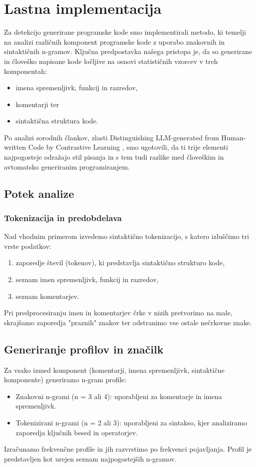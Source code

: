 \documentclass[sigconf,nonacm]{acmart}
\begin{document}
\section{Lastna implementacija}
Za detekcijo generirane programske kode smo implementirali metodo, ki temelji na analizi različnih komponent programske kode z uporabo znakovnih in sintaktičnih n-gramov. Ključna predpostavka našega pristopa je, da so generirane in človeško napisane kode ločljive na osnovi statističnih vzorcev v treh komponentah:
\begin{itemize}
	\item imena spremenljivk, funkcij in razredov,
	\item komentarji ter
	\item sintaktična struktura kode.
\end{itemize}
Po analizi sorodnih člankov, zlasti Distinguishing LLM-generated from Human-written Code by Contrastive Learning \cite{xu2024distinguishing}, smo ugotovili, da ti trije elementi najpogosteje odražajo stil pisanja in s tem tudi razlike med človeškim in avtomatsko generiranim programiranjem.
\subsection{Potek analize}
\subsubsection{Tokenizacija in predobdelava}
Nad vhodnim primerom izvedemo sintaktično tokenizacijo, s katero izluščimo tri vrste podatkov:
\begin{enumerate}
	\item zaporedje števil (tokenov), ki predstavlja sintaktično strukturo kode,
	\item seznam imen spremenljivk, funkcij in razredov,
	\item seznam komentarjev.
\end{enumerate}
Pri predprocesiranju imen in komentarjev črke v nizih pretvorimo na male, skrajšamo zaporedja "praznih" znakov ter odstranimo vse ostale nečrkovne znake.

\subsection{Generiranje profilov in značilk}
Za vsako izmed komponent (komentarji, imena spremenljivk, sintaktične komponente) generiramo n-gram profile:
\begin{itemize}
	\item Znakovni n-grami (n = 3 ali 4): uporabljeni za komentarje in imena spremenljivk.
	\item Tokenizirani n-grami (n = 2 ali 3): uporabljeni za sintakso, kjer analiziramo zaporedja ključnih besed in operatorjev.
\end{itemize}
Izračunamo frekvenčne profile in jih razvrstimo po frekvenci pojavljanja. Profil je predstavljen kot urejen seznam najpogostejših n-gramov.
\end{document}
